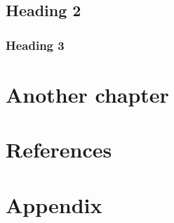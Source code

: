 \documentclass[headsepline,titlepage,twoside,12pt,toc=flat,headings=normal]{scrreprt}
\begin{document}
\section{Heading 2}
\subsection{Heading 3}
\lipsum[1-5]
\chapter{Another chapter}\label{ch:anotherchapter}


\chapter{References}\label{ch:references}



\chapter{Appendix}\label{ch:appendix}
\end{document}
